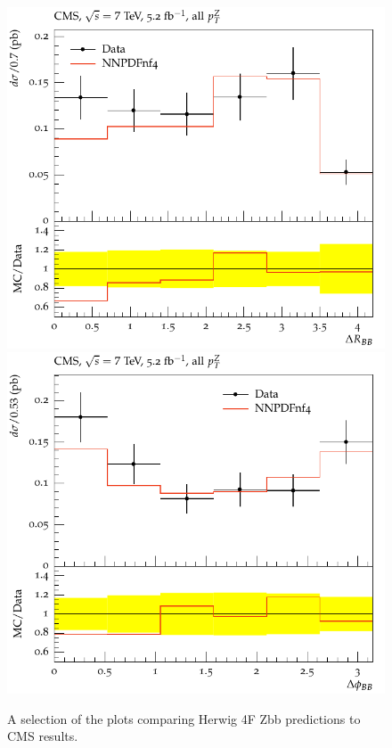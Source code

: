 \documentclass[11pt]{cernrep} \usepackage{graphicx,epsfig} 
\begin{document}
\begin{figure}[htbp]
   \includegraphics[scale=0.65]{figs/zbb/herwig4F/d01-x01-y01.pdf} 
   \includegraphics[scale=0.65]{figs/zbb/herwig4F/d02-x01-y01.pdf} 
\caption{A selection of the plots comparing Herwig 4F Zbb predictions to CMS results.}
\label{zbb-herwig4F-cms}
\end{figure}
\end{document}
